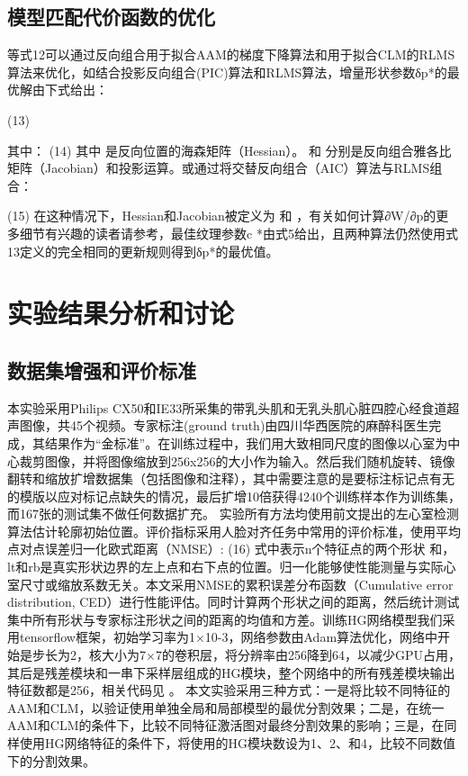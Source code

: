 \subsection{模型匹配代价函数的优化} 

等式12可以通过反向组合用于拟合AAM的梯度下降算法和用于拟合CLM的RLMS算法来优化，如结合投影反向组合(PIC)算法\citep{Jan2017}和RLMS算法，增量形状参数δp*的最优解由下式给出：

          (13)
          
其中：
	  	(14)
其中  是反向位置的海森矩阵（Hessian）。 和  分别是反向组合雅各比矩阵（Jacobian）和投影运算。或通过将交替反向组合（AIC）算法\citep{Jan2017}与RLMS组合：

 (15)
在这种情况下，Hessian和Jacobian被定义为  和 ，有关如何计算∂W/∂p的更多细节有兴趣的读者请参考\citep{Jan2017}，最佳纹理参数c *由式5给出，且两种算法仍然使用式13定义的完全相同的更新规则得到δp*的最优值。

\section{实验结果分析和讨论}
\subsection{数据集增强和评价标准}

本实验采用Philips CX50和IE33所采集的带乳头肌和无乳头肌心脏四腔心经食道超声图像，共45个视频。专家标注(ground truth)由四川华西医院的麻醉科医生完成，其结果作为“金标准”。在训练过程中，我们用大致相同尺度的图像以心室为中心裁剪图像，并将图像缩放到256x256的大小作为输入。然后我们随机旋转、镜像翻转和缩放扩增数据集（包括图像和注释），其中需要注意的是要标注标记点有无的模版以应对标记点缺失的情况，最后扩增10倍获得4240个训练样本作为训练集，而167张的测试集不做任何数据扩充。
实验所有方法均使用前文提出的左心室检测算法估计轮廓初始位置。评价指标采用人脸对齐任务中常用的评价标准，使用平均点对点误差归一化欧式距离（NMSE）:
	  	(16)
式中表示n个特征点的两个形状 和，lt和rb是真实形状边界的左上点和右下点的位置。归一化能够使性能测量与实际心室尺寸或缩放系数无关。本文采用NMSE的累积误差分布函数（Cumulative error distribution, CED）进行性能评估。同时计算两个形状之间的距离，然后统计测试集中所有形状与专家标注形状之间的距离的均值和方差。训练HG网络模型我们采用tensorflow框架，初始学习率为1×10-3，网络参数由Adam算法\citep{Kingma2014}优化，网络中开始是步长为2，核大小为7×7的卷积层，将分辨率由256降到64，以减少GPU占用，其后是残差模块和一串下采样层组成的HG模块，整个网络中的所有残差模块输出特征数都是256，相关代码见 。
本文实验采用三种方式：一是将比较不同特征的AAM和CLM，以验证使用单独全局和局部模型的最优分割效果；二是，在统一AAM和CLM的条件下，比较不同特征激活图对最终分割效果的影响；三是，在同样使用HG网络特征的条件下，将使用的HG模块数设为1、2、和4，比较不同数值下的分割效果。

